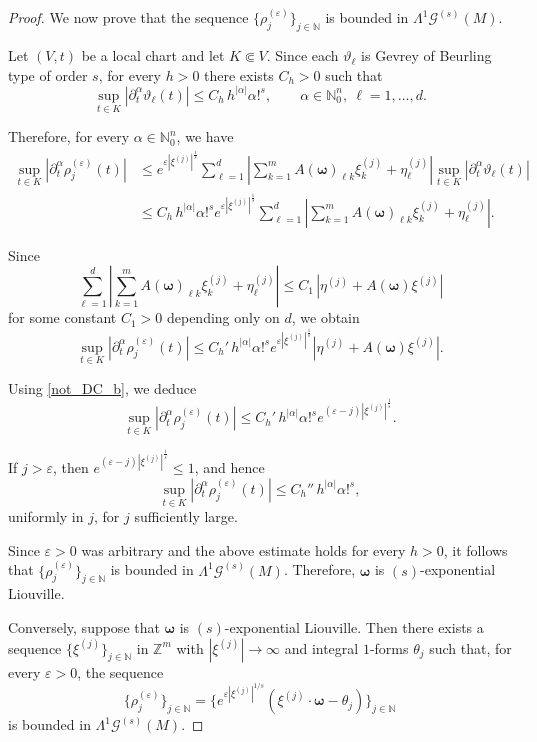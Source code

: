 \documentclass[10pt,a4paper]{amsart}
\begin{document}
\begin{proof}
	
	We now prove that the sequence $\{\rho_j^{(\varepsilon)}\}_{j\in\mathbb{N}}$ is bounded in 
	$\mathsf{\Lambda}^1\mathscr{G}^{(s)}(M)$.
	
	Let $(V,t)$ be a local chart and let $K\Subset V$. 
	Since each $\vartheta_\ell$ is Gevrey of Beurling type of order $s$, 
	for every $h>0$ there exists $C_h>0$ such that
	\[
	\sup_{t\in K} |\partial_t^\alpha \vartheta_\ell(t)|
	\le C_h\, h^{|\alpha|}\alpha!^s, \qquad \alpha\in\mathbb{N}_0^n,
	\ \ell=1,\dots,d.
	\]
	
	Therefore, for every $\alpha\in\mathbb{N}_0^n$, we have
	\begin{align*}
		\sup_{t\in K} |\partial_t^\alpha \rho_j^{(\varepsilon)}(t)|
		&\le e^{\varepsilon|\xi^{(j)}|^{\frac{1}{s}}} \sum_{\ell=1}^{d} \left|
		\sum_{k=1}^{m} A(\boldsymbol{\omega})_{\ell k}\xi^{(j)}_k  + \eta^{(j)}_\ell \right| \sup_{t\in K} |\partial_t^\alpha \vartheta_\ell(t)| \\
		&\le C_h\, h^{|\alpha|}\alpha!^s e^{\varepsilon|\xi^{(j)}|^{\frac{1}{s}}} 		\sum_{\ell=1}^{d} \left| \sum_{k=1}^{m} A(\boldsymbol{\omega})_{\ell k}\xi^{(j)}_k
		+ \eta^{(j)}_\ell \right|.
	\end{align*}
	
	Since
	\[
	\sum_{\ell=1}^{d} \left| \sum_{k=1}^{m} A(\boldsymbol{\omega})_{\ell k}\xi^{(j)}_k
	+ \eta^{(j)}_\ell \right| \le C_1\, |\eta^{(j)} + A(\boldsymbol{\omega})\xi^{(j)}| 
	\]
	for some constant $C_1>0$ depending only on $d$, 
	we obtain
	\[
	\sup_{t\in K} |\partial_t^\alpha \rho_j^{(\varepsilon)}(t)|  \le C_h'\, h^{|\alpha|}\alpha!^s e^{\varepsilon|\xi^{(j)}|^{\frac{1}{s}}} |\eta^{(j)} + A(\boldsymbol{\omega})\xi^{(j)}|.
	\]
	
	Using \eqref{not_DC_b}, we deduce
	\[
	\sup_{t\in K} |\partial_t^\alpha \rho_j^{(\varepsilon)}(t)|
	\le 	C_h'\, h^{|\alpha|}\alpha!^s e^{(\varepsilon-j)|\xi^{(j)}|^{\frac{1}{s}}}.
	\]
	
	If $j>\varepsilon$, then $e^{(\varepsilon-j)|\xi^{(j)}|^{\frac{1}{s}}}\le 1$, and hence
	\[
	\sup_{t\in K} |\partial_t^\alpha \rho_j^{(\varepsilon)}(t)|
	\le C_h''\, h^{|\alpha|}\alpha!^s,
	\]
	uniformly in $j$, for $j$ sufficiently large.
	
	Since $\varepsilon>0$ was arbitrary and the above estimate holds for every $h>0$, 
	it follows that $\{\rho_j^{(\varepsilon)}\}_{j\in\mathbb{N}}$ is bounded in 
	$\mathsf{\Lambda}^1\mathscr{G}^{(s)}(M)$.	
	Therefore, $\boldsymbol{\omega}$ is $(s)$-exponential Liouville.
	
	Conversely, suppose that $\boldsymbol{\omega}$ is $(s)$-exponential Liouville. 
	Then there exists a sequence $\{\xi^{(j)}\}_{j\in\mathbb{N}}$ in $\mathbb{Z}^m$ with $|\xi^{(j)}|\to\infty$ 
	and integral $1$-forms $\theta_j$ such that, for every $\varepsilon>0$, 
	the sequence
	\[
	\{\rho_j^{(\varepsilon)} \}_{j\in\mathbb{N}} = \big\{e^{\varepsilon|\xi^{(j)}|^{1/s}} 	(\xi^{(j)}\cdot \boldsymbol{\omega} - \theta_j)\big\}_{j\in\mathbb{N}}
	\]
	is bounded in $\mathsf{\Lambda}^1\mathscr{G}^{(s)}(M)$.
	

\end{proof}
\end{document}
